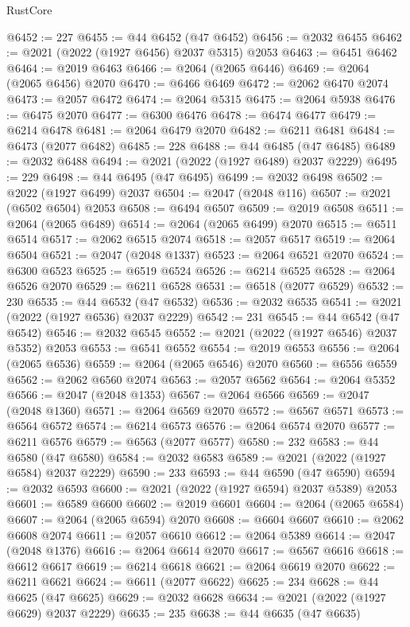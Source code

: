 \begin{lexlean}{RustCore}
\begin{coremodule}
@6452 := 227
@6455 := @44 @6452 (@47 @6452)
@6456 := @2032 @6455
@6462 := @2021 (@2022 (@1927 @6456) @2037 @5315) @2053
@6463 := @6451 @6462
@6464 := @2019 @6463
@6466 := @2064 (@2065 @6446)
@6469 := @2064 (@2065 @6456) @2070
@6470 := @6466 @6469
@6472 := @2062 @6470 @2074
@6473 := @2057 @6472
@6474 := @2064 @5315
@6475 := @2064 @5938
@6476 := @6475 @2070
@6477 := @6300 @6476
@6478 := @6474 @6477
@6479 := @6214 @6478
@6481 := @2064 @6479 @2070
@6482 := @6211 @6481
@6484 := @6473 (@2077 @6482)
@6485 := 228
@6488 := @44 @6485 (@47 @6485)
@6489 := @2032 @6488
@6494 := @2021 (@2022 (@1927 @6489) @2037 @2229)
@6495 := 229
@6498 := @44 @6495 (@47 @6495)
@6499 := @2032 @6498
@6502 := @2022 (@1927 @6499) @2037
@6504 := @2047 (@2048 @116)
@6507 := @2021 (@6502 @6504) @2053
@6508 := @6494 @6507
@6509 := @2019 @6508
@6511 := @2064 (@2065 @6489)
@6514 := @2064 (@2065 @6499) @2070
@6515 := @6511 @6514
@6517 := @2062 @6515 @2074
@6518 := @2057 @6517
@6519 := @2064 @6504
@6521 := @2047 (@2048 @1337)
@6523 := @2064 @6521 @2070
@6524 := @6300 @6523
@6525 := @6519 @6524
@6526 := @6214 @6525
@6528 := @2064 @6526 @2070
@6529 := @6211 @6528
@6531 := @6518 (@2077 @6529)
@6532 := 230
@6535 := @44 @6532 (@47 @6532)
@6536 := @2032 @6535
@6541 := @2021 (@2022 (@1927 @6536) @2037 @2229)
@6542 := 231
@6545 := @44 @6542 (@47 @6542)
@6546 := @2032 @6545
@6552 := @2021 (@2022 (@1927 @6546) @2037 @5352) @2053
@6553 := @6541 @6552
@6554 := @2019 @6553
@6556 := @2064 (@2065 @6536)
@6559 := @2064 (@2065 @6546) @2070
@6560 := @6556 @6559
@6562 := @2062 @6560 @2074
@6563 := @2057 @6562
@6564 := @2064 @5352
@6566 := @2047 (@2048 @1353)
@6567 := @2064 @6566
@6569 := @2047 (@2048 @1360)
@6571 := @2064 @6569 @2070
@6572 := @6567 @6571
@6573 := @6564 @6572
@6574 := @6214 @6573
@6576 := @2064 @6574 @2070
@6577 := @6211 @6576
@6579 := @6563 (@2077 @6577)
@6580 := 232
@6583 := @44 @6580 (@47 @6580)
@6584 := @2032 @6583
@6589 := @2021 (@2022 (@1927 @6584) @2037 @2229)
@6590 := 233
@6593 := @44 @6590 (@47 @6590)
@6594 := @2032 @6593
@6600 := @2021 (@2022 (@1927 @6594) @2037 @5389) @2053
@6601 := @6589 @6600
@6602 := @2019 @6601
@6604 := @2064 (@2065 @6584)
@6607 := @2064 (@2065 @6594) @2070
@6608 := @6604 @6607
@6610 := @2062 @6608 @2074
@6611 := @2057 @6610
@6612 := @2064 @5389
@6614 := @2047 (@2048 @1376)
@6616 := @2064 @6614 @2070
@6617 := @6567 @6616
@6618 := @6612 @6617
@6619 := @6214 @6618
@6621 := @2064 @6619 @2070
@6622 := @6211 @6621
@6624 := @6611 (@2077 @6622)
@6625 := 234
@6628 := @44 @6625 (@47 @6625)
@6629 := @2032 @6628
@6634 := @2021 (@2022 (@1927 @6629) @2037 @2229)
@6635 := 235
@6638 := @44 @6635 (@47 @6635)

\end{coremodule}
\end{lexlean}
